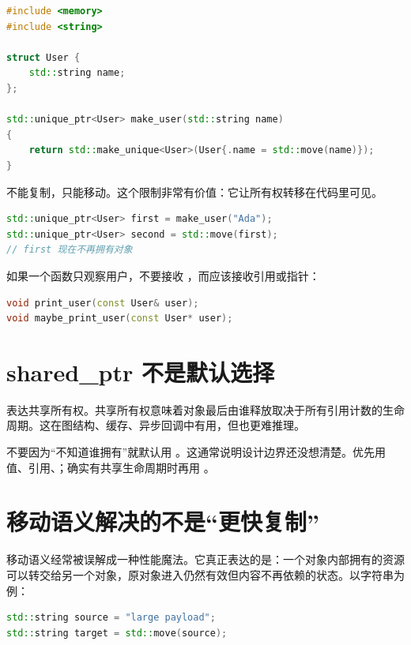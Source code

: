 \begin{lstlisting}[language=C++,caption={独占智能指针表达唯一拥有者}]
#include <memory>
#include <string>

struct User {
    std::string name;
};

std::unique_ptr<User> make_user(std::string name)
{
    return std::make_unique<User>(User{.name = std::move(name)});
}
\end{lstlisting}

 不能复制，只能移动。这个限制非常有价值：它让所有权转移在代码里可见。

\begin{lstlisting}[language=C++,caption={移动表示所有权转移}]
std::unique_ptr<User> first = make_user("Ada");
std::unique_ptr<User> second = std::move(first);
// first 现在不再拥有对象
\end{lstlisting}

如果一个函数只观察用户，不要接收 ，而应该接收引用或指针：

\begin{lstlisting}[language=C++,caption={观察对象不要夺取所有权}]
void print_user(const User& user);
void maybe_print_user(const User* user);
\end{lstlisting}

\section{shared\_ptr 不是默认选择}

 表达共享所有权。共享所有权意味着对象最后由谁释放取决于所有引用计数的生命周期。这在图结构、缓存、异步回调中有用，但也更难推理。

\begin{warningbox}
不要因为“不知道谁拥有”就默认用 。这通常说明设计边界还没想清楚。优先用值、引用、；确实有共享生命周期时再用 。
\end{warningbox}

\section{移动语义解决的不是“更快复制”}

移动语义经常被误解成一种性能魔法。它真正表达的是：一个对象内部拥有的资源可以转交给另一个对象，原对象进入仍然有效但内容不再依赖的状态。以字符串为例：

\begin{lstlisting}[language=C++,caption={移动字符串}]
std::string source = "large payload";
std::string target = std::move(source);
\end{lstlisting}

